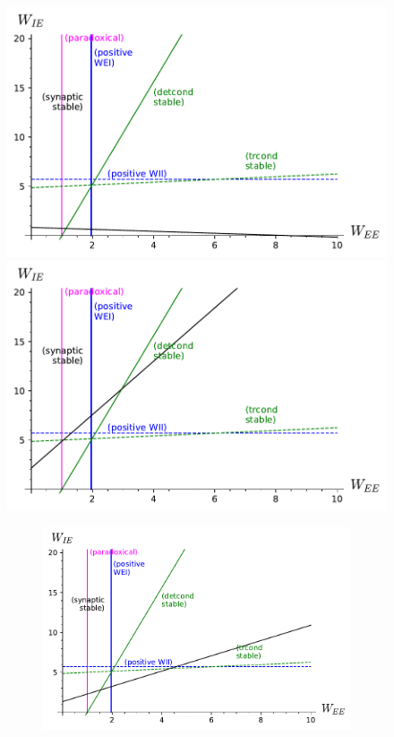 \documentclass[twocolumn]{article}
\begin{document}
\begin{figure}[!ht]
\centering
\parbox[c]{\columnwidth}{
\includegraphics[width=\columnwidth]{TF_stability_slowHomeo.pdf}
\includegraphics[width=\columnwidth]{TF_stability_slowCross.pdf}}
\parbox[c]{\columnwidth}{
\begin{figure}[H]
\includegraphics[width=\columnwidth]{TF_stability_similar.pdf}

\end{figure}}
\end{figure}
\end{document}
